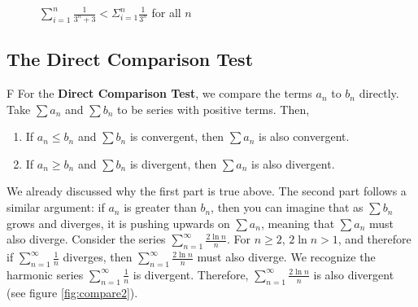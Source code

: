 \begin{figure}
    \centering
    \caption{$\sum_{i=1}^n \frac{1}{3^n + 3} < \Sigma_{i = 1}^n 
    \frac{1}{3^n}$ for all $n$}
    \label{fig:compare1}
\end{figure}
\subsection{The Direct Comparison Test}
F For the \textbf{Direct Comparison Test}, we 
compare the terms $a_n$ to $b_n$ directly. Take $\sum a_n$ and $\sum b_n$ to 
be series with positive terms. Then, 
\begin{enumerate}
\item If $a_n \leq b_n$ and $\sum b_n$ is convergent, then $\sum a_n$ is 
also convergent.
\item If $a_n \geq b_n$ and $\sum b_n$ is divergent, then $\sum a_n$ is 
also divergent.
\end{enumerate}

We already discussed why the first part is true above. The second part follows 
a similar argument: if $a_n$ is greater than $b_n$, then you can imagine that 
as $\sum b_n$ grows and diverges, it is pushing upwards on $\sum a_n$, 
meaning that $\sum a_n$ must also diverge. Consider the series $\sum_{n=1}^
\infty \frac{2\ln{n}}{n}$. For $n \geq 2$, $2\ln{n} > 1$, and therefore if 
$\sum_{n=1}^\infty \frac{1}{n}$ diverges, then $\sum_{n=1}^\infty \frac{2
\ln{n}}{n}$ must also diverge. We recognize the harmonic series $\sum_{n=1}^
\infty \frac{1}{n}$ is divergent. Therefore, $\sum_{n=1}^\infty 
\frac{2\ln{n}}{n}$ is also divergent (see figure \ref{fig:compare2}).

